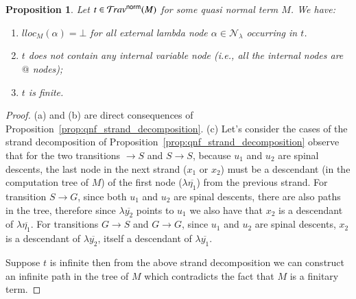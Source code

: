 \documentclass{elsarticle}
\makeatletter
\theoremstyle{plain}
\newtheorem{proposition}[theorem]{Proposition}
\theoremstyle{definition}
\theoremstyle{remark}
\newcommand\Nodes{\mathcal{N}}%
\newcommand\NodesLmd{\Nodes_\lambda}%
\newcommand{\normalizing}{{\sf norm}}
\newcommand{\travsetnorm}{\travset^\normalizing}
\renewcommand\ie{{\it i.e.\@\xspace}}
\makeatother
\begin{document}
\begin{proposition}
\label{prop:qnf_traversals_are_finite}
Let $t \in \travsetnorm(M)$ for some \emph{quasi normal} term $M$. We have:
\begin{enumerate}[label=(\alph*), nosep]
\item $lloc_M(\alpha) = \bot$ for all external lambda node $\alpha \in \NodesLmd$ occurring in $t$.
\item $t$ does not contain any internal variable node (\ie, all the internal nodes are $@$ nodes);
\item $t$ is finite.
\end{enumerate}
\end{proposition}
\begin{proof}
(a) and (b) are direct consequences of Proposition~\ref{prop:qnf_strand_decomposition}.
(c) Let's consider the cases of the strand decomposition of Proposition~\ref{prop:qnf_strand_decomposition}
observe that for the two transitions $\rightarrow S$ and $S \rightarrow S$, because $u_1$ and $u_2$ are spinal descents, the last node in the next strand ($x_1$ or $x_2$) must be a descendant (in the computation tree of $M$) of the first node ($\lambda\overline{\eta_1}$) from the previous strand.
For transition $S\rightarrow G$, since both $u_1$ and $u_2$ are spinal descents, there are also paths in the tree, therefore since $\lambda\overline{y_2}$ points to $u_1$ we also have that $x_2$ is a descendant of $\lambda\overline{\eta_1}$. For transitions
$G \rightarrow S$ and $G \rightarrow G$, since $u_1$ and $u_2$ are spinal descents, $x_2$ is a descendant of $\lambda\overline{y_2}$, itself a descendant of $\lambda\overline{y_1}$.

Suppose $t$ is infinite then from the above strand decomposition we can construct an infinite path in the tree of $M$ which contradicts the fact that $M$ is a finitary term.
\end{proof}
\end{document}
